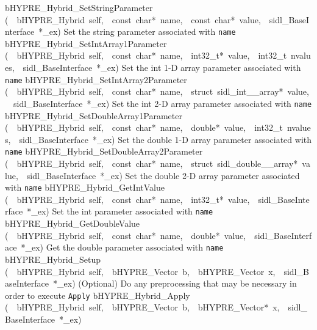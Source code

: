 \documentclass{article}
\begin{document}
\begin{cxxentry}
\begin{cxxentry}
\begin{cxxnames}
        {bHYPRE\_Hybrid\_SetStringParameter}
        {(\ \ bHYPRE\_Hybrid\ self,\ \ const\ char*\ name,\ \ const\ char*\ value,\ \ sidl\_BaseInterface\ *\_ex)}
        {
Set the string parameter associated with {\tt name}}
        {}
\label{cxx.5.10.21}
        {bHYPRE\_Hybrid\_SetIntArray1Parameter}
        {(\ \ bHYPRE\_Hybrid\ self,\ \ const\ char*\ name,\ \ int32\_t*\ value,\ \ int32\_t\ nvalues,\ \ sidl\_BaseInterface\ *\_ex)}
        {
Set the int 1-D array parameter associated with {\tt name}}
        {}
\label{cxx.5.10.22}
        {bHYPRE\_Hybrid\_SetIntArray2Parameter}
        {(\ \ bHYPRE\_Hybrid\ self,\ \ const\ char*\ name,\ \ struct\ sidl\_int\_\_array*\ value,\ \ sidl\_BaseInterface\ *\_ex)}
        {
Set the int 2-D array parameter associated with {\tt name}}
        {}
\label{cxx.5.10.23}
        {bHYPRE\_Hybrid\_SetDoubleArray1Parameter}
        {(\ \ bHYPRE\_Hybrid\ self,\ \ const\ char*\ name,\ \ double*\ value,\ \ int32\_t\ nvalues,\ \ sidl\_BaseInterface\ *\_ex)}
        {
Set the double 1-D array parameter associated with {\tt name}}
        {}
\label{cxx.5.10.24}
        {bHYPRE\_Hybrid\_SetDoubleArray2Parameter}
        {(\ \ bHYPRE\_Hybrid\ self,\ \ const\ char*\ name,\ \ struct\ sidl\_double\_\_array*\ value,\ \ sidl\_BaseInterface\ *\_ex)}
        {
Set the double 2-D array parameter associated with {\tt name}}
        {}
\label{cxx.5.10.25}
        {bHYPRE\_Hybrid\_GetIntValue}
        {(\ \ bHYPRE\_Hybrid\ self,\ \ const\ char*\ name,\ \ int32\_t*\ value,\ \ sidl\_BaseInterface\ *\_ex)}
        {
Set the int parameter associated with {\tt name}}
        {}
\label{cxx.5.10.26}
        {bHYPRE\_Hybrid\_GetDoubleValue}
        {(\ \ bHYPRE\_Hybrid\ self,\ \ const\ char*\ name,\ \ double*\ value,\ \ sidl\_BaseInterface\ *\_ex)}
        {
Get the double parameter associated with {\tt name}}
        {}
\label{cxx.5.10.27}
        {bHYPRE\_Hybrid\_Setup}
        {(\ \ bHYPRE\_Hybrid\ self,\ \ bHYPRE\_Vector\ b,\ \ bHYPRE\_Vector\ x,\ \ sidl\_BaseInterface\ *\_ex)}
        {
(Optional) Do any preprocessing that may be necessary in
order to execute {\tt Apply}}
        {}
\label{cxx.5.10.28}
        {bHYPRE\_Hybrid\_Apply}
        {(\ \ bHYPRE\_Hybrid\ self,\ \ bHYPRE\_Vector\ b,\ \ bHYPRE\_Vector*\ x,\ \ sidl\_BaseInterface\ *\_ex)}

\end{cxxnames}
\end{cxxentry}
\end{cxxentry}
\end{document}
